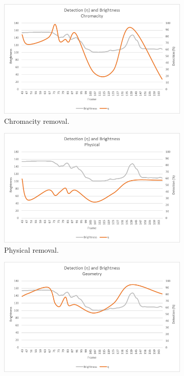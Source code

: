 \begin{figure}
\centering
\begin{subfigure}{.32\linewidth}
  \includegraphics[width=1\linewidth]{figures/selectinganalgorithm_chromacity.jpg}
  \caption{Chromacity removal.}
\end{subfigure}
\hfill
\begin{subfigure}{.32\linewidth}
  \includegraphics[width=1\linewidth]{figures/selectinganalgorithm_physical.jpg}
  \caption{Physical removal.}
\end{subfigure}
\hfill
\begin{subfigure}{.32\linewidth}
  \includegraphics[width=1\linewidth]{figures/selectinganalgorithm_geometry.jpg}

\end{subfigure}
\end{figure}

